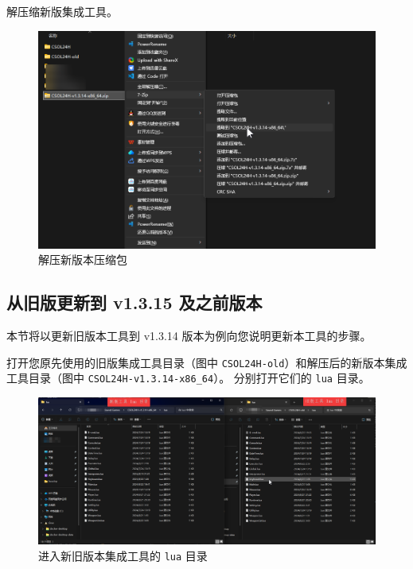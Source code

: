 解压缩新版集成工具。

\begin{figure}[H]
    \Centering
    \includegraphics[width=\textwidth]{docs/assets/update/extract_new_version.png}
    \caption{解压新版本压缩包}
\end{figure}

\subsection{从旧版更新到 v1.3.15 及之前版本}

本节将以更新旧版本工具到 v1.3.14 版本为例向您说明更新本工具的步骤。

打开您原先使用的旧版集成工具目录（图中 \lstinline{CSOL24H-old}）和解压后的新版本集成工具目录（图中 \lstinline{CSOL24H-v1.3.14-x86_64}）。
分别打开它们的 \lstinline{lua} 目录。

\begin{figure}[H]
    \Centering
    \includegraphics[width=\textwidth]{docs/assets/update/replace_00.png}
    \caption{进入新旧版本集成工具的 \lstinline{lua} 目录}
\end{figure}

